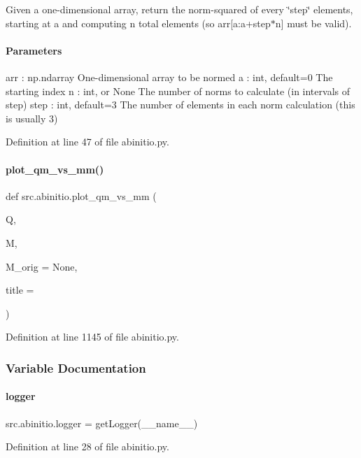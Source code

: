 Given a one-\/dimensional array, return the norm-\/squared of every \char`\"{}step\char`\"{} elements, starting at \textquotesingle{}a\textquotesingle{} and computing \textquotesingle{}n\textquotesingle{} total elements (so arr\mbox{[}a\+:a+step$\ast$n\mbox{]} must be valid). 

\paragraph*{Parameters }

arr \+: np.\+ndarray One-\/dimensional array to be normed a \+: int, default=0 The starting index n \+: int, or None The number of norms to calculate (in intervals of step) step \+: int, default=3 The number of elements in each norm calculation (this is usually 3) 

Definition at line 47 of file abinitio.\+py.

\mbox{\label{namespacesrc_1_1abinitio_a15ff594ec7734a01ef603b9bb780d966}} 
\paragraph{\texorpdfstring{plot\+\_\+qm\+\_\+vs\+\_\+mm()}{plot\_qm\_vs\_mm()}}
{\footnotesize\ttfamily def src.\+abinitio.\+plot\+\_\+qm\+\_\+vs\+\_\+mm (\begin{DoxyParamCaption}\item[{}]{Q,  }\item[{}]{M,  }\item[{}]{M\+\_\+orig = {\ttfamily None},  }\item[{}]{title = {\ttfamily \textquotesingle{}\textquotesingle{}} }\end{DoxyParamCaption})}



Definition at line 1145 of file abinitio.\+py.



\subsubsection{Variable Documentation}
\mbox{\label{namespacesrc_1_1abinitio_a5f31a5792044a3fac63afc0cf112ac9c}} 
\paragraph{\texorpdfstring{logger}{logger}}
{\footnotesize\ttfamily src.\+abinitio.\+logger = get\+Logger(\+\_\+\+\_\+name\+\_\+\+\_\+)}



Definition at line 28 of file abinitio.\+py.

